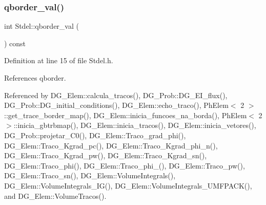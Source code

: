 \subsubsection{\texorpdfstring{qborder\+\_\+val()}{qborder\_val()}}
{\footnotesize\ttfamily int Stdel\+::qborder\+\_\+val (\begin{DoxyParamCaption}{ }\end{DoxyParamCaption}) const\hspace{0.3cm}{\ttfamily [inline]}}



Definition at line 15 of file Stdel.\+h.



References qborder.



Referenced by D\+G\+\_\+\+Elem\+::calcula\+\_\+tracos(), D\+G\+\_\+\+Prob\+::\+D\+G\+\_\+\+E\+I\+\_\+flux(), D\+G\+\_\+\+Prob\+::\+D\+G\+\_\+initial\+\_\+conditions(), D\+G\+\_\+\+Elem\+::echo\+\_\+traco(), Ph\+Elem$<$ 2 $>$\+::get\+\_\+trace\+\_\+border\+\_\+map(), D\+G\+\_\+\+Elem\+::inicia\+\_\+funcoes\+\_\+na\+\_\+borda(), Ph\+Elem$<$ 2 $>$\+::inicia\+\_\+gbtrbmap(), D\+G\+\_\+\+Elem\+::inicia\+\_\+tracos(), D\+G\+\_\+\+Elem\+::inicia\+\_\+vetores(), D\+G\+\_\+\+Prob\+::projetar\+\_\+\+C0(), D\+G\+\_\+\+Elem\+::\+Traco\+\_\+grad\+\_\+phi(), D\+G\+\_\+\+Elem\+::\+Traco\+\_\+\+Kgrad\+\_\+pc(), D\+G\+\_\+\+Elem\+::\+Traco\+\_\+\+Kgrad\+\_\+phi\+\_\+n(), D\+G\+\_\+\+Elem\+::\+Traco\+\_\+\+Kgrad\+\_\+pw(), D\+G\+\_\+\+Elem\+::\+Traco\+\_\+\+Kgrad\+\_\+sn(), D\+G\+\_\+\+Elem\+::\+Traco\+\_\+phi(), D\+G\+\_\+\+Elem\+::\+Traco\+\_\+phi\+\_(), D\+G\+\_\+\+Elem\+::\+Traco\+\_\+pw(), D\+G\+\_\+\+Elem\+::\+Traco\+\_\+sn(), D\+G\+\_\+\+Elem\+::\+Volume\+Integrals(), D\+G\+\_\+\+Elem\+::\+Volume\+Integrals\+\_\+\+I\+G(), D\+G\+\_\+\+Elem\+::\+Volume\+Integrals\+\_\+\+U\+M\+F\+P\+A\+C\+K(), and D\+G\+\_\+\+Elem\+::\+Volume\+Tracos().

